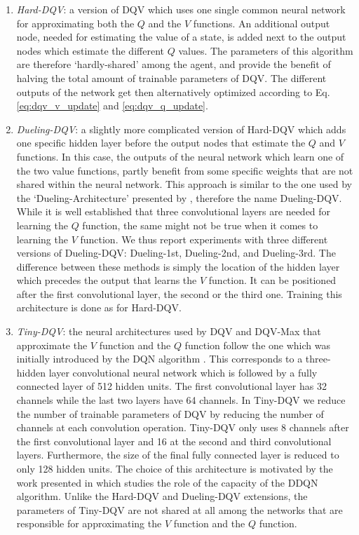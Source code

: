 \begin{enumerate}
    \item \textit{Hard-DQV}: a version of DQV which uses one single common neural network for approximating both the $Q$ and the $V$ functions. An additional output node, needed for estimating the value of a state, is added next to the output nodes which estimate the different $Q$ values. The parameters of this algorithm are therefore `hardly-shared' among the agent, and provide the benefit of halving the total amount of trainable parameters of DQV. The different outputs of the network get then alternatively optimized according to Eq. \ref{eq:dqv_v_update} and \ref{eq:dqv_q_update}.

    \item \textit{Dueling-DQV}: a slightly more complicated version of Hard-DQV which adds one specific hidden layer before the output nodes that estimate the $Q$ and $V$ functions. In this case, the outputs of the neural network which learn one of the two value functions, partly benefit from some specific weights that are not shared within the neural network. This approach is similar to the one used by the `Dueling-Architecture' presented by \citet{wang2016dueling}, therefore the name Dueling-DQV. While it is well established that three convolutional layers are needed \cite{mnih2015human, van2016deep} for learning the $Q$ function, the same might not be true when it comes to learning the $V$ function. We thus report experiments with three different versions of Dueling-DQV: Dueling-1st, Dueling-2nd, and Dueling-3rd. The difference between these methods is simply the location of the hidden layer which precedes the output that learns the $V$ function. It can be positioned after the first convolutional layer, the second or the third one. Training this architecture is done as for Hard-DQV.

    \item \textit{Tiny-DQV}: the neural architectures used by DQV and DQV-Max that approximate the $V$ function and the $Q$ function follow the one which was initially introduced by the DQN algorithm \cite{mnih2015human}. This corresponds to a three-hidden layer convolutional neural network which is followed by a fully connected layer of 512 hidden units. The first convolutional layer has 32 channels while the last two layers have 64 channels. In Tiny-DQV we reduce the number of trainable parameters of DQV by reducing the number of channels at each convolution operation. Tiny-DQV only uses 8 channels after the first convolutional layer and 16 at the second and third convolutional layers. Furthermore, the size of the final fully connected layer is reduced to only 128 hidden units. The choice of this architecture is motivated by the work presented in \cite{van2018deep} which studies the role of the capacity of the DDQN algorithm. Unlike the Hard-DQV and Dueling-DQV extensions, the parameters of Tiny-DQV are not shared at all among the networks that are responsible for approximating the $V$ function and the $Q$ function.
\end{enumerate}

